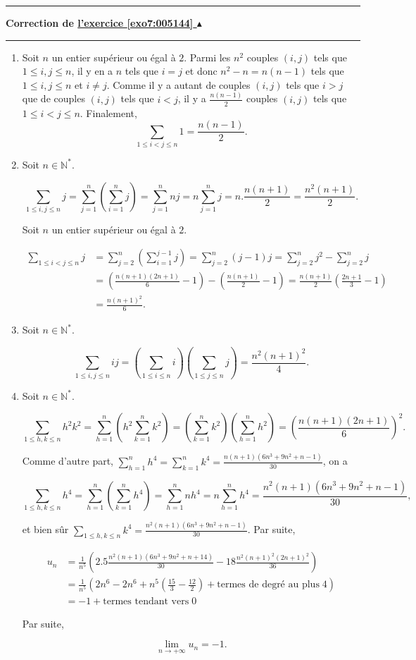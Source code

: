 \documentclass[11pt,a4paper]{article}
\newcommand{\Nn}{\mathbb{N}} \newcommand{\N}{\mathbb{N}}
\newcounter{exo}
\newcommand{\correction}[1]{\hypertarget{cor7:#1}{}\label{cor7:#1}{\bf Correction de \hyperlink{exo7:#1}{l'exercice \ref{exo7:#1} $\blacktriangle$}}\vspace{1mm}\hrule\vspace{1mm}}
\newcommand{\fincorrection}{\vspace{1mm}\hrule\vspace*{7mm}}
\begin{document}
\fincorrection
\correction{005144}
\begin{enumerate}
\item  Soit $n$ un entier supérieur ou égal à $2$. Parmi les $n^2$ couples $(i,j)$ tels que $1\leq i,j\leq n$, il y
en a $n$ tels que $i=j$ et donc $n^2-n=n(n-1)$ tels que $1\leq i,j\leq n$ et $i\neq j$. Comme il y a autant de couples
$(i,j)$ tels que $i>j$ que de couples $(i,j)$ tels que $i<j$, il y a $\frac{n(n-1)}{2}$ couples $(i,j)$ tels que $1\leq
i<j\leq n$. Finalement,
$$\sum_{1\leq i<j\leq n}^{}1=\frac{n(n-1)}{2}.$$

\item  Soit $n\in\Nn^*$.

$$\sum_{1\leq i,j\leq n}^{}j=\sum_{j=1}^{n}\left(\sum_{i=1}^{n}j\right)=\sum_{j=1}^{n}nj=n\sum_{j=1}^{n}j=n.\frac{n(n+1)}{2}
=\frac{n^2(n+1)}{2}.$$

Soit $n$ un entier supérieur ou égal à $2$.

\begin{align*}
\sum_{1\leq i<j\leq
n}^{}j&=\sum_{j=2}^{n}\left(\sum_{i=1}^{j-1}j\right)=\sum_{j=2}^{n}(j-1)j=\sum_{j=2}^{n}j^2-\sum_{j=2}^{n}j\\
 &=(\frac{n(n+1)(2n+1)}{6}-1)-(\frac{n(n+1)}{2}-1)=\frac{n(n+1)}{2}(\frac{2n+1}{3}-1)\\
 &=\frac{n(n+1)^2}{6}.
\end{align*}

\item  Soit $n\in\Nn^*$.

$$\sum_{1\leq i,j\leq n}^{}ij=(\sum_{1\leq i\leq n}^{}i)(\sum_{1\leq j\leq n}^{}j)=\frac{n^2(n+1)^2}{4}.$$

\item  Soit $n\in\Nn^*$.

$$\sum_{1\leq h,k\leq
n}^{}h^2k^2=\sum_{h=1}^{n}(h^2\sum_{k=1}^{n}k^2)=(\sum_{k=1}^{n}k^2)(\sum_{h=1}^{n}h^2)=\left(\frac{n(n+1)(2n+1)}{6}\right)^
2.$$

Comme d'autre part, $\sum_{h=1}^{n}h^4=\sum_{k=1}^{n}k^4=\frac{n(n+1)(6n^3+9n^2+n-1)}{30}$, on a

$$\sum_{1\leq h,k\leq
n}^{}h^4=\sum_{h=1}^{n}(\sum_{k=1}^{n}h^4)=\sum_{h=1}^{n}nh^4=n\sum_{h=1}^{n}h^4=\frac{n^2(n+1)(6n^3+9n^2+n-1)}{30},$$

et bien sûr $\sum_{1\leq h,k\leq
n}^{}k^4=\frac{n^2(n+1)(6n^3+9n^2+n-1)}{30}$. Par suite,

\begin{align*}
u_n&=\frac{1}{n^5}\left(2.5\frac{n^2(n+1)(6n^3+9n^2+n+14)}{30}-18\frac{n^2(n+1)^2(2n+1)^2}{36}\right)\\
 &=\frac{1}{n^5}(2n^6-2n^6+n^5(\frac{15}{3}-\frac{12}{2})+\mbox{termes de degré au plus}\;4)\\
 &=-1+\mbox{termes tendant vers}\;0
\end{align*}

Par suite,

$$\lim_{n\rightarrow +\infty}u_n=-1.$$

\end{enumerate}
\end{document}
